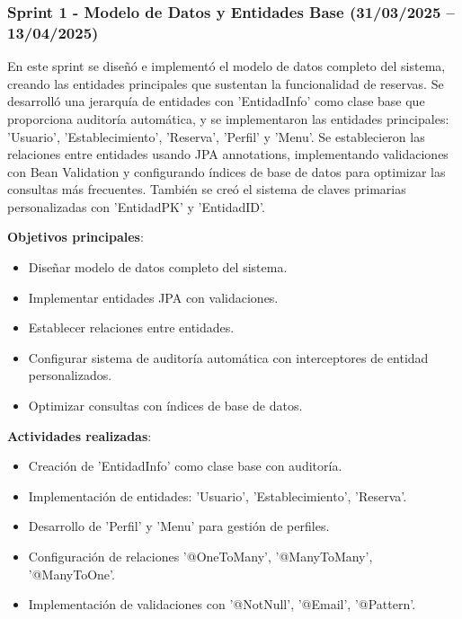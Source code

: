 \subsubsection{Sprint 1 - Modelo de Datos y Entidades Base (31/03/2025 – 13/04/2025)} 
En este sprint se diseñó e implementó el modelo de datos completo del sistema, creando las entidades principales que sustentan la funcionalidad de reservas. Se desarrolló una jerarquía de entidades con 'EntidadInfo' como clase base que proporciona auditoría automática, y se implementaron las entidades principales: 'Usuario', 'Establecimiento', 'Reserva', 'Perfil' y 'Menu'. Se establecieron las relaciones entre entidades usando JPA annotations, implementando validaciones con Bean Validation y configurando índices de base de datos para optimizar las consultas más frecuentes. También se creó el sistema de claves primarias personalizadas con 'EntidadPK' y 'EntidadID'.

\textbf{Objetivos principales}:
\begin{itemize}
\tightlist
\item
Diseñar modelo de datos completo del sistema.
\item
Implementar entidades JPA con validaciones.
\item
Establecer relaciones entre entidades.
\item
Configurar sistema de auditoría automática con interceptores de entidad personalizados.
\item
Optimizar consultas con índices de base de datos.
\end{itemize}

\textbf{Actividades realizadas}:
\begin{itemize}
\tightlist
\item
Creación de 'EntidadInfo' como clase base con auditoría.
\item
Implementación de entidades: 'Usuario', 'Establecimiento', 'Reserva'.
\item
Desarrollo de 'Perfil' y 'Menu' para gestión de perfiles.
\item
Configuración de relaciones '@OneToMany', '@ManyToMany', '@ManyToOne'.
\item
Implementación de validaciones con '@NotNull', '@Email', '@Pattern'.
\end{itemize}


